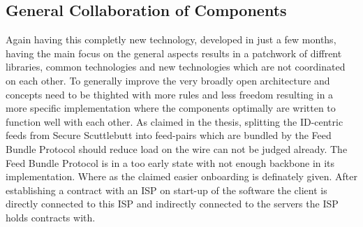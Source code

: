 \subsection{General Collaboration of Components}
Again having this completly new technology, developed in just a few months, having the main focus on the general aspects results in a patchwork of diffrent libraries, common technologies and new technologies which are not coordinated on each other. To generally improve the very broadly open architecture and concepts need to be thighted with more rules and less freedom resulting in a more specific implementation where the components optimally are written to function well with each other. As claimed in the thesis, splitting the ID-centric feeds from Secure Scuttlebutt into feed-pairs which are bundled by the Feed Bundle Protocol should reduce load on the wire can not be judged already. The Feed Bundle Protocol is in a too early state with not enough backbone in its implementation. Where as the claimed easier onboarding is definately given. After establishing a contract with an ISP on start-up of the software the client is directly connected to this ISP and indirectly connected to the servers the ISP holds contracts with. 